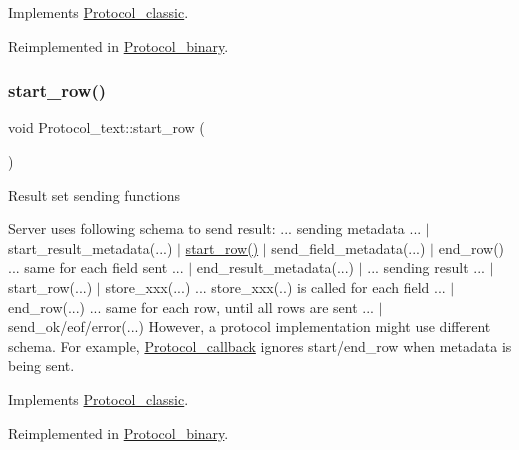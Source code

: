 Implements \mbox{\hyperlink{classProtocol__classic}{Protocol\+\_\+classic}}.



Reimplemented in \mbox{\hyperlink{classProtocol__binary_a912d03865e662d1568ae766a6371a3b1}{Protocol\+\_\+binary}}.

\mbox{\label{classProtocol__text_a72aad9182cd1313187654ba88712d54a}} 
\subsubsection{\texorpdfstring{start\+\_\+row()}{start\_row()}}
{\footnotesize\ttfamily void Protocol\+\_\+text\+::start\+\_\+row (\begin{DoxyParamCaption}{ }\end{DoxyParamCaption})\hspace{0.3cm}{\ttfamily [virtual]}}

Result set sending functions

Server uses following schema to send result\+: ... sending metadata ... $\vert$ start\+\_\+result\+\_\+metadata(...) $\vert$ \mbox{\hyperlink{classProtocol__text_a72aad9182cd1313187654ba88712d54a}{start\+\_\+row()}} $\vert$ send\+\_\+field\+\_\+metadata(...) $\vert$ end\+\_\+row() ... same for each field sent ... $\vert$ end\+\_\+result\+\_\+metadata(...) $\vert$ ... sending result ... $\vert$ start\+\_\+row(...) $\vert$ store\+\_\+xxx(...) ... store\+\_\+xxx(..) is called for each field ... $\vert$ end\+\_\+row(...) ... same for each row, until all rows are sent ... $\vert$ send\+\_\+ok/eof/error(...) However, a protocol implementation might use different schema. For example, \mbox{\hyperlink{classProtocol__callback}{Protocol\+\_\+callback}} ignores start/end\+\_\+row when metadata is being sent. 

Implements \mbox{\hyperlink{classProtocol__classic_acebdc50db1e9403c19bb8909af300fec}{Protocol\+\_\+classic}}.



Reimplemented in \mbox{\hyperlink{classProtocol__binary_ae3111e401880cd6d68b3587e2fbb8091}{Protocol\+\_\+binary}}.

\mbox{\label{classProtocol__text_a66166244c73b0d710d2896c411514890}} 
